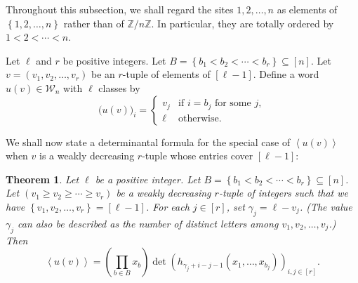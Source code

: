 \documentclass[reqno]{amsart}
\newcommand{\0}{\phantom{c}}
\newcommand{\swt}[1]{\left\langle #1 \right\rangle} %
\newcommand{\std}[1]{\widetilde{#1}} %
\newcommand{\mcW}{\mathcal{W}}
\newcommand{\ZZ}{\mathbb{Z}}
\let\prodnonlimits\prod
\renewcommand{\prod}{\prodnonlimits\limits}
\newcommand{\set}[1]{\left\{ #1 \right\}}
\newcommand{\tup}[1]{\left( #1 \right)}
\newcommand{\ive}[1]{\left[ #1 \right]}
\theoremstyle{plain}
\newtheorem{thm}{Theorem}[section]
\theoremstyle{definition}
\newtheorem{example}[thm]{Example}
\numberwithin{equation}{section}
\begin{document}

Throughout this subsection, we shall regard the sites $1, 2, \ldots, n$ as elements of $\set{1, 2, \ldots, n}$ rather than of $\ZZ/n\ZZ$.
In particular, they are totally ordered by $1 < 2 < \cdots < n$.

Let $\ell$ and $r$ be positive integers.
Let $B = \set{ b_1 < b_2 < \cdots < b_r} \subseteq \ive{n}$.
Let $v = \tup{v_1, v_2, \ldots, v_r}$ be an $r$-tuple of elements of $\ive{\ell-1}$.
Define a word $u(v) \in \mcW_n$ with $\ell$ classes by
\begin{equation}
\label{eq:weakly_decreasing_construction}
\bigl( u(v) \bigr)_i = \begin{cases}
v_j & \text{if $i = b_j$ for some $j$}, \\
\ell & \text{otherwise}.
\end{cases}
\end{equation}

We shall now state a determinantal formula for the special case of $\swt{u(v)}$
when $v$ is a weakly decreasing $r$-tuple whose entries cover $\ive{\ell-1}$:

\begin{thm}
\label{thm:determinant_form}
Let $\ell$ be a positive integer.
Let $B = \set{ b_1 < b_2 < \cdots < b_r} \subseteq \ive{n}$.
Let $\tup{v_1 \geq v_2 \geq \cdots \geq v_r}$ be a weakly decreasing $r$-tuple of integers such that we have $\set{v_1, v_2, \ldots, v_r} = \ive{\ell-1}$.
For each $j \in \ive{r}$, set $\gamma_j = \ell - v_j$.
(The value $\gamma_j$ can also be described as the number of distinct letters among $v_1, v_2, \dotsc, v_j$.)
Then
\[
\swt{u(v)} = \left(  \prod_{b \in B} x_b \right)  \det \left(  h_{\gamma_j+i-j-1}(x_1,\dotsc,x_{b_j}) \right)_{i, j \in \ive{r}}.
\]
\end{thm}
\end{document}
